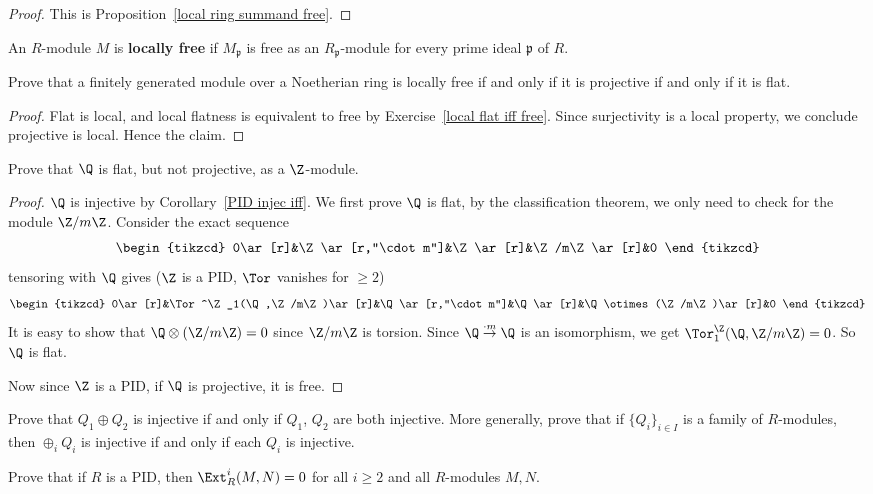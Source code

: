 \begin{proof}
This is Proposition~\ref{local ring summand free}.
\end{proof}
\begin{exercise}
An $R$-module $M$ is \textbf{locally free} if $M_\mathfrak{p}$ is free as an $R_{\mathfrak{p}}$-module for every prime ideal $\mathfrak{p}$ of $R$.\par
Prove that a finitely generated module over a Noetherian ring is locally free if and only if it is projective if and only if it is flat.
\end{exercise}
\begin{proof}
Flat is local, and local flatness is equivalent to free by Exercise~\ref{local flat iff free}. Since surjectivity is a local property, we conclude projective is local. Hence the claim. 
\end{proof}
\begin{exercise}
Prove that $\Q$ is flat, but not projective, as a $\Z$-module.
\end{exercise}
\begin{proof}
$\Q$ is injective by Corollary~\ref{PID injec iff}. We first prove $\Q$ is flat, by the classification theorem, we only need to check for the module $\Z/m\Z$. Consider the exact sequence
\[\begin{tikzcd}
0\ar[r]&\Z\ar[r,"\cdot m"]&\Z\ar[r]&\Z/m\Z\ar[r]&0
\end{tikzcd}\]
tensoring with $\Q$ gives ($\Z$ is a PID, $\Tor$ vanishes for $\geqslant 2$)
\[\begin{tikzcd}
0\ar[r]&\Tor^\Z_1(\Q,\Z/m\Z)\ar[r]&\Q\ar[r,"\cdot m"]&\Q\ar[r]&\Q\otimes(\Z/m\Z)\ar[r]&0
\end{tikzcd}\]
It is easy to show that $\Q\otimes(\Z/m\Z)=0$ since $\Z/m\Z$ is torsion. Since $\Q\stackrel{\cdot m}{\to}\Q$ is an isomorphism, we get $\Tor_1^\Z(\Q,\Z/m\Z)=0$. So $\Q$ is flat.\par
Now since $\Z$ is a PID, if $\Q$ is projective, it is free.
\end{proof}
\begin{exercise}
Prove that $Q_1\oplus Q_2$ is injective if and only if $Q_1$, $Q_2$ are both injective. More
generally, prove that if $\{Q_i\}_{i\in I}$ is a family of $R$-modules, then $\oplus_iQ_i$ is injective if and only if each $Q_i$ is injective.
\end{exercise}
\begin{exercise}
Prove that if $R$ is a PID, then $\Ext^i_R(M,N)=0$ for all $i\geqslant2$ and all $R$-modules $M,N$.
\end{exercise}
